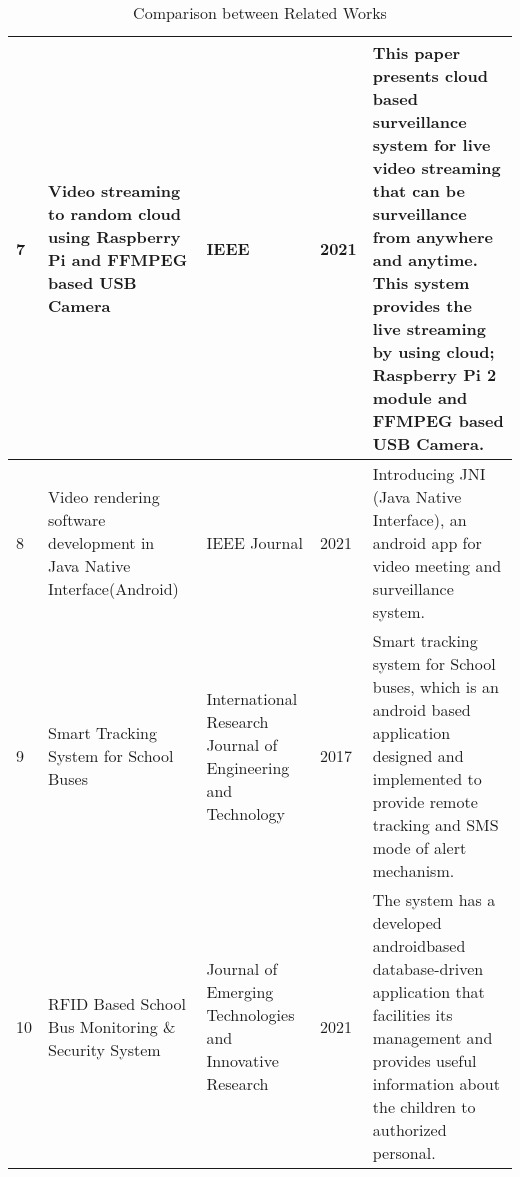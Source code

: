     \begin{table}
    	\centering
    	\caption{Comparison between Related Works}
    	\label{table }
    	\begin{tabular}{|p{.7cm}|p{3.5cm}|p{2.5cm}|p{1cm}|p{5.7cm}|}
  	
            \hline
            7 & Video streaming to random cloud using Raspberry Pi and FFMPEG based USB Camera
             & IEEE & 2021 & This paper presents cloud based surveillance system for live video streaming that can be surveillance from anywhere and anytime. This system provides the live streaming by using cloud; Raspberry Pi 2 module and FFMPEG based USB Camera. \\
\hline
8 & Video rendering software development in Java Native Interface(Android)
 &IEEE Journal& 2021 & Introducing JNI (Java Native Interface), an android app for video meeting and surveillance system.\\
\hline
9 & Smart Tracking System for School Buses & International Research Journal of Engineering and Technology & 2017 & Smart tracking system for School buses, which is
an android based application designed and implemented to
provide remote tracking and SMS mode of alert mechanism.\\
\hline
10 & RFID Based School Bus Monitoring \& Security System& Journal of Emerging Technologies and Innovative Research & 2021&The system has a developed androidbased database-driven application that facilities its management and provides useful information about the children to authorized personal.\\
	\hline
    

   \end{tabular}
   \end{table}
   
   